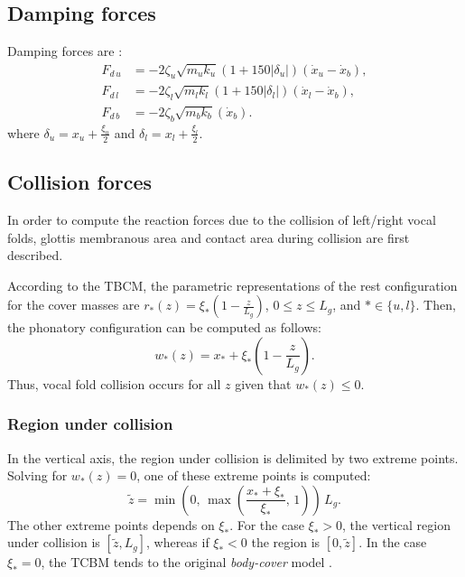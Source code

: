 \documentclass[a4paper,10pt]{article}
\begin{document}
\subsection{Damping forces}
Damping forces are \cite{galindo_modeling_2017,lucero_simulations_2005}:
\begin{equation} \label{Eq_S1s2_01}
  \begin{aligned}
    F_{d\,u} & = -2\zeta_{u}\sqrt{m_{u} k_{u}} \left( 1 + 150 |\delta_{u}| \right)
                        \left( \dot{x}_{u} - \dot{x}_{b} \right), \\
    F_{d\,l} & = -2\zeta_{l}\sqrt{m_{l} k_{l}}  \left( 1 + 150 |\delta_{l}| \right)
                        \left( \dot{x}_{l} - \dot{x}_{b} \right), \\
    F_{d\,b} & = -2\zeta_{b}\sqrt{m_{b} k_{b}} \left( \dot{x}_{b} \right).
  \end{aligned}
\end{equation}
where $\delta_{u} = x_{u} + \frac{\xi_{u}}{2}$ and $\delta_{l} = x_{l} + \frac{\xi_{l}}{2}$.

\subsection{Collision forces}
In order to compute the reaction forces due to the collision of left/right vocal folds,
glottis membranous area and contact area during collision are first described. 

According to the TBCM, the parametric representations of the rest configuration for the cover masses are
$r_{*}(z) = \xi_{*} \left(1 - \frac{z}{L_{g}} \right)$, $0\leq z \leq L_{g}$, and $* \in \{u,l\}$.
Then, the phonatory configuration can be computed as follows:
\begin{equation} \label{Eq_S1s3_01}
  w_{*}(z) = x_{*} + \xi_{*} \left(1 - \frac{z}{L_{g}} \right).
\end{equation}
Thus, vocal fold collision occurs for all $z$ given that $w_{*}(z) \leq 0$.

\subsubsection{Region under collision}
In the vertical axis, the region under collision is delimited by two extreme points.
Solving for $w_{*}(z) = 0$, one of these extreme points is computed:
\begin{equation} \label{Eq_S1s3_02}
  \tilde{z} = \min\left(0, \, \max\left(\frac{ x_{*} + \xi_{*} }{\xi_{*}}, \, 1\right) \right) \, L_{g}.
\end{equation}
The other extreme points depends on $\xi_{*}$. For the case $\xi_{*}>0$, the vertical region under
collision is $[\tilde{z},L_{g}]$, whereas if $\xi_{*}<0$ the region is $[0,\tilde{z}]$.
In the case $\xi_{*}=0$, the TCBM tends to the original \emph{body-cover} model \cite{story_voice_1995}.
\end{document}
